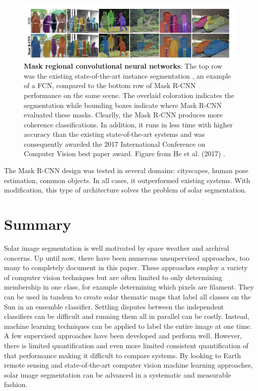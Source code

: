 \documentclass[twoside]{report}
\begin{document}
\begin{figure}[ht]
  \begin{center}
    \includegraphics[scale=0.5]{mrcnn.png}
    \caption{{\bf Mask regional convolutional neural networks}: The top row was the existing state-of-the-art instance segmentation \cite{li2016fully}, an example of a FCN, compared to the bottom row of Mask R-CNN performance on the same scene. The overlaid coloration indicates the segmentation while bounding boxes indicate where Mask R-CNN evaluated these masks. Clearlly, the Mask R-CNN produces more coherence classifications. In addition, it runs in less time with higher accuracy than the existing state-of-the-art systems and was consequently awarded the 2017 International Conference on Computer Vision best paper award. Figure from He et al. (2017) \cite{he:2017}.}
    \label{fig:mrcnn}
 \end{center}
\end{figure}

The Mask R-CNN design was tested in several domains: cityscapes, human pose estimation, common objects. In all cases, it outperformed existing systems. With modification, this type of architecture solves the problem of solar segmentation. 

\section{Summary}
Solar image segmentation is well motivated by space weather and archival concerns. Up until now, there have been numerous unsupervised approaches, too many to completely document in this paper. These approaches employ a variety of computer vision techniques but are often limited to only determining membership in one class, for example determining which pixels are filament. They can be used in tandem to create solar thematic maps that label all classes on the Sun in an ensemble classifier. Settling disputes between the independent classifiers can be difficult and running them all in parallel can be costly. Instead, machine learning techniques can be applied to label the entire image at one time. A few supervised approaches have been developed and perform well. However, there is limited quantification and even more limited consistent quantification of that performance making it difficult to compare systems. By looking to Earth remote sensing and state-of-the-art computer vision machine learning approaches, solar image segmentation can be advanced in a systematic and measurable fashion. 
\end{document}
